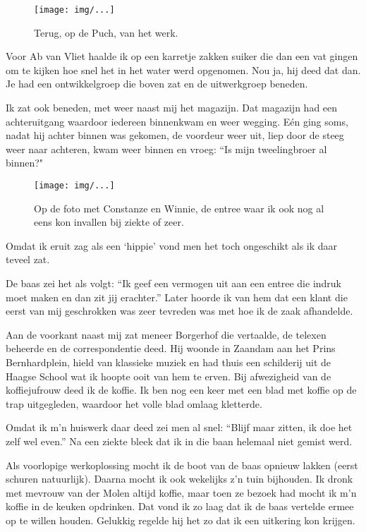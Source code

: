 \documentclass[10pt,twoside,openright]{memoir}
\begin{document}
\begin{figure}[t]
\texttt{[image: img/...]}
\caption{Terug, op de Puch, van het werk.}
\end{figure}

Voor Ab van Vliet haalde ik op een karretje zakken suiker die dan een vat gingen om te kijken hoe snel het in het water werd opgenomen. Nou ja, hij deed dat dan. Je had een ontwikkelgroep die boven zat en de uitwerkgroep beneden. 

Ik zat ook beneden, met weer naast mij het magazijn. Dat magazijn had een achteruitgang waardoor iedereen binnenkwam en weer wegging. Eén ging soms, nadat hij achter binnen was gekomen, de voordeur weer uit, liep door de steeg weer naar achteren, kwam weer binnen en vroeg: ``Is mijn tweelingbroer al binnen?"

\begin{figure}[t]
\texttt{[image: img/...]}
\caption{Op de foto met Constanze en Winnie, de entree waar ik ook nog al eens kon invallen bij ziekte of zeer.}
\end{figure}

Omdat ik eruit zag als een `hippie' vond men het toch ongeschikt als ik daar teveel zat.

De baas zei het als volgt: ``Ik geef een vermogen uit aan een entree die indruk moet maken en dan zit jij erachter.'' Later hoorde ik van hem dat een klant die eerst van mij geschrokken was zeer tevreden was met hoe ik de zaak afhandelde.

Aan de voorkant naast mij zat meneer Borgerhof die vertaalde, de telexen beheerde en de correspondentie deed. Hij woonde in Zaandam aan het Prins Bernhardplein, hield van klassieke muziek en had thuis een schilderij uit de Haagse School wat ik hoopte ooit van hem te erven. Bij afwezigheid van de koffiejufrouw deed ik de koffie. Ik ben nog een keer met een blad met koffie op de trap uitgegleden, waardoor het volle blad omlaag kletterde.

Omdat ik m'n huiswerk daar deed zei men al snel: ``Blijf maar zitten, ik doe het zelf wel even.'' Na een ziekte bleek dat ik in die baan helemaal niet gemist werd. 

Als voorlopige werkoplossing mocht ik de boot van de baas opnieuw lakken (eerst schuren natuurlijk). Daarna mocht ik ook wekelijks z’n tuin bijhouden. Ik dronk met mevrouw van der Molen altijd koffie, maar toen ze bezoek had mocht ik m’n koffie in de keuken opdrinken. Dat vond ik zo laag dat ik de baas vertelde ermee op te willen houden. Gelukkig regelde hij het zo dat ik een uitkering kon krijgen. 
\end{document}

